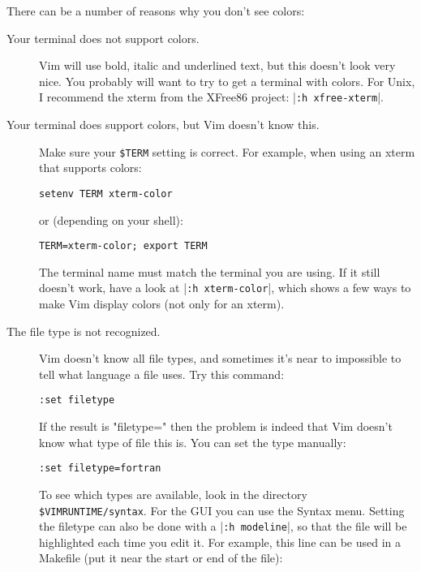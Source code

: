 There can be a number of reasons why you don't see colors:
\begin{description}
				\item [Your terminal does not support colors.]
								Vim will use bold, italic and underlined text, but this doesn't look very nice.
								You probably will want to try to get a terminal with colors.
								For Unix, I recommend the xterm from the XFree86 project: |\verb!:h xfree-xterm!|.

				\item [Your terminal does support colors, but Vim doesn't know this.]
								Make sure your \verb!$TERM! setting is correct.  For example, when using an
								xterm that supports colors:

								\begin{Verbatim}[samepage=true]
		 setenv TERM xterm-color
								\end{Verbatim}

								or (depending on your shell):

								\begin{Verbatim}[samepage=true]
		 TERM=xterm-color; export TERM
								\end{Verbatim}

								The terminal name must match the terminal you are using.
								If it still doesn't work, have a look at |\verb!:h xterm-color!|, which shows a few ways to make Vim display colors (not only for an xterm).

				\item [The file type is not recognized.]
								Vim doesn't know all file types, and sometimes it's near to impossible
								to tell what language a file uses.  Try this command:

								\begin{Verbatim}[samepage=true]
		 :set filetype
								\end{Verbatim}

								If the result is "filetype=" then the problem is indeed that Vim doesn't know what type of file this is.
								You can set the type manually:

								\begin{Verbatim}[samepage=true]
		 :set filetype=fortran
												\end{Verbatim}

								To see which types are available, look in the directory \verb!$VIMRUNTIME/syntax!.
								For the GUI you can use the Syntax menu.
								Setting the filetype can also be done with a |\verb!:h modeline!|, so that the file will be highlighted each time you edit it.
								For example, this line can be used in a Makefile (put it near the start or end of the file):


\end{description}
